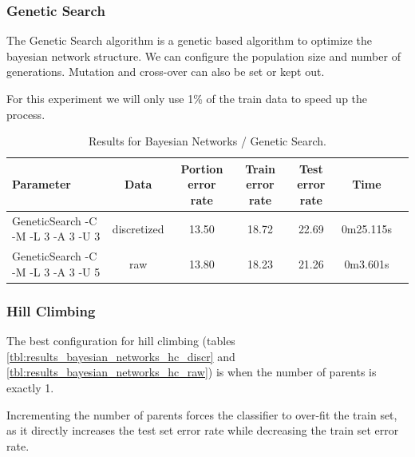 \documentclass[a4paper]{llncs}
\begin{document}
\subsubsection{Genetic Search}

The Genetic Search algorithm is a genetic based algorithm to optimize the bayesian network structure.
We can configure the population size and number of generations. Mutation and cross-over can also
be set or kept out.

For this experiment we will only use 1\% of the train data to speed up the process.

\begin{table}[ht]
  \begin{center}
  \begin{tabular}{ | l | c | c | c | c | c | c |}
    \hline
    \textbf{Parameter} & \textbf{Data} & \textbf{Portion error rate} & \textbf{Train error rate} & \textbf{Test error rate} & \textbf{Time} \\ \hline
    GeneticSearch -C -M -L 3 -A 3 -U 3 & discretized & 13.50 & 18.72 & 22.69 & 0m25.115s \\ \hline
    GeneticSearch -C -M -L 3 -A 3 -U 5 & raw & 13.80 & 18.23 & 21.26 & 0m3.601s \\ \hline
  \end{tabular}
  \caption{Results for Bayesian Networks / Genetic Search.}
  \label{tbl:results_bayesian_networks_gs}
  \end{center}
\end{table}

\subsubsection{Hill Climbing}

The best configuration for hill climbing (tables \ref{tbl:results_bayesian_networks_hc_discr}
and \ref{tbl:results_bayesian_networks_hc_raw})
is when the number of parents is exactly 1.

Incrementing the number of parents forces the classifier to over-fit the train set, as it
directly increases the test set error rate while decreasing the train set error rate.
\end{document}
